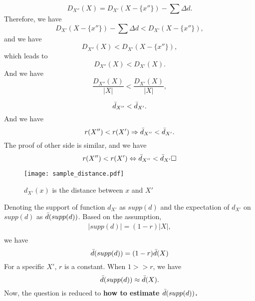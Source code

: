 \documentclass[letterpaper]{article} %
\begin{document}
\begin{equation*}
    D_{X''}(X) = D_{X'}(X-\{x''\})-\sum \Delta d.
\end{equation*}
Therefore, we have
\begin{equation*}
     D_{X'}(X-\{x''\}) - \sum \Delta d < D_{X'}(X-\{x''\}),
\end{equation*}
and we have
\begin{equation*}
    D_{X''}(X) < D_{X'}(X-\{x''\}),
\end{equation*}
which leads to
\begin{equation*}
    D_{X''}(X) < D_{X'}(X).
\end{equation*}
And we have
\begin{equation*}
    \frac{D_{X''}(X)}{|X|} < \frac{D_{X'}(X)}{|X|},
\end{equation*}

\begin{equation*}
    \Bar{d}_{X''} < \Bar{d}_{X'}.
\end{equation*}
And we have
\begin{equation*}
    r(X'') < r(X') \Rightarrow \Bar{d}_{X''} < \Bar{d}_{X'}.
\end{equation*}
The proof of other side is similar, and we have
\begin{equation*}
    r(X'') < r(X') \Leftrightarrow  \Bar{d}_{X''} < \Bar{d}_{X'} \square
\end{equation*}

\begin{figure}[htbp]
    \centering
    \texttt{[image: sample\_distance.pdf]}
    \caption{$d_{X'}(x)$ is the distance between $x$ and $X'$}
    \label{dm_definition}
\end{figure}

Denoting the support of function $d_{X'}$ as $supp(d)$ and the expectation of $d_{X'}$ on $supp(d)$ as $\Bar{d}(supp(d))$. Based on the assumption,
\begin{align*}
    |supp(d)| = (1-r)|X|,\\
\end{align*}
we have
\begin{equation*}
    \Bar{d}(supp(d)) = (1-r)\Bar{d}(X)
\end{equation*}
For a specific $X'$, $r$ is a constant. When $1>>r$, we have
\begin{equation*}
    \Bar{d}(supp(d)) \approx \Bar{d}(X).
\end{equation*}
Now, the question is reduced to \textbf{how to estimate $\Bar{d}(supp(d))$.}
\end{document}
